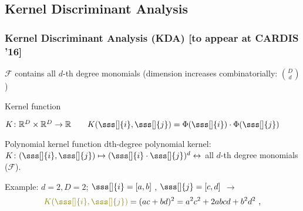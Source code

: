 \subsection{Kernel Discriminant Analysis}
\begin{frame}
[fragile]
\frametitle{Kernel Discriminant Analysis (KDA) [to appear at CARDIS '16]}
\vspace{-10pt}
\begin{figure}
\centering
{
}
\end{figure}
\vspace{-10pt}
$\mathcal{F}$ contains all $d$-th degree monomials \small{(dimension increases combinatorially: ${{D}\choose{d}}$)}
\pause

\begin{block}{Kernel function}
 \begin{centering}$K\colon\mathbb{R}^D\times \mathbb{R}^D \rightarrow \mathbb{R} \qquad K(\sss[]{i},\sss[]{j}) = \Phi(\sss[]{i})\cdot \Phi(\sss[]{j})
$\end{centering}
\end{block}
\pause
\vspace{-5pt}
\begin{block}{Polynomial kernel function}
dth-degree polynomial kernel: $K\colon(\sss[]{i},\sss[]{j}) \mapsto ( \sss[]{i}\cdot \sss[]{j})^d \leftrightarrow$  all $d$-th degree monomials ($\mathcal{F}$).
\pause

Example: 
$d=2, D=2$; $\sss[]{i} = [a,b]$ , $\sss[]{j} = [c,d]$ $\longrightarrow$
\vspace{-10pt}
\begin{equation*}
\textcolor{olive}{K(\sss[]{i},\sss[]{j})} = (ac + bd)^2 = a^2c^2 + 2abcd + b^2d^2 \mbox{ ,}
\end{equation*}


\end{block}
\end{frame}
